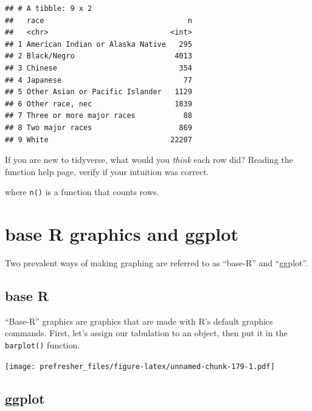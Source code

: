 \documentclass[]{book}
\newenvironment{Shaded}{\begin{snugshade}}{\end{snugshade}}
\newcommand{\KeywordTok}[1]{\textcolor[rgb]{0.13,0.29,0.53}{\textbf{#1}}}
\newcommand{\NormalTok}[1]{#1}
\newcommand{\OperatorTok}[1]{\textcolor[rgb]{0.81,0.36,0.00}{\textbf{#1}}}
\theoremstyle{definition}
\theoremstyle{definition}
\theoremstyle{definition}
\theoremstyle{remark}
\begin{document}
\begin{verbatim}
## # A tibble: 9 x 2
##   race                                 n
##   <chr>                            <int>
## 1 American Indian or Alaska Native   295
## 2 Black/Negro                       4013
## 3 Chinese                            354
## 4 Japanese                            77
## 5 Other Asian or Pacific Islander   1129
## 6 Other race, nec                   1839
## 7 Three or more major races           88
## 8 Two major races                    869
## 9 White                            22207
\end{verbatim}

If you are new to tidyverse, what would you \emph{think} each row did? Reading the function help page, verify if your intuition was correct.

where \texttt{n()} is a function that counts rows.

\hypertarget{base-r-graphics-and-ggplot}{%
\section{base R graphics and ggplot}\label{base-r-graphics-and-ggplot}}

Two prevalent ways of making graphing are referred to as ``base-R'' and ``ggplot''.

\hypertarget{base-r}{%
\subsection{base R}\label{base-r}}

``Base-R'' graphics are graphics that are made with R's default graphics commands. First, let's assign our tabulation to an object,
then put it in the \texttt{barplot()} function.

\begin{Shaded}
\end{Shaded}

\texttt{[image: prefresher\_files/figure-latex/unnamed-chunk-179-1.pdf]}

\hypertarget{ggplot}{%
\subsection{ggplot}\label{ggplot}}
\end{document}
